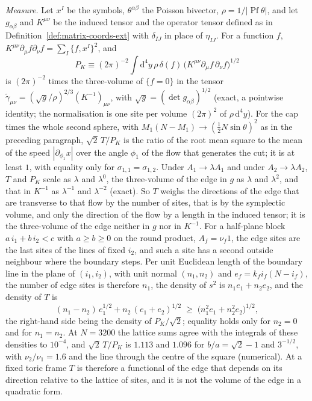 \emph{Measure.} Let \(x^I\) be the symbols, \(\theta^{\alpha\beta}\) the Poisson bivector, \(\rho=1/|\operatorname{Pf}\theta|\), and let \(g_{\alpha\beta}\) and \(K^{\mu\nu}\) be the induced tensor and the operator tensor defined as in Definition~\ref{def:matrix-coords-ext} with \(\delta_{IJ}\) in place of \(\eta_{IJ}\). For a function \(f\), \(K^{\mu\nu}\partial_\mu f\partial_\nu f=\sum_I\{f,x^I\}^2\), and
\[
P_K\equiv(2\pi)^{-2}\int\mathrm d^4y\,\rho\,\delta(f)\,\bigl(K^{\mu\nu}\partial_\mu f\,\partial_\nu f\bigr)^{1/2}
\]
is \((2\pi)^{-2}\) times the three-volume of \(\{f=0\}\) in the tensor \(\tilde\gamma_{\mu\nu}=(\sqrt g/\rho)^{2/3}(K^{-1})_{\mu\nu}\), with \(\sqrt g=(\det g_{\alpha\beta})^{1/2}\) (exact, a pointwise identity; the normalisation is one site per volume \((2\pi)^2\) of \(\rho\,\mathrm d^4y\)). For the cap times the whole second sphere, with \(M_1(N-M_1)\to(\tfrac12N\sin\theta)^2\) as in the preceding paragraph, \(\sqrt2\,T/P_K\) is the ratio of the root mean square to the mean of the speed \(|\partial_{\phi_1}x|\) over the angle \(\phi_1\) of the flow that generates the cut; it is at least \(1\), with equality only for \(\sigma_{1,1}=\sigma_{1,2}\). Under \(A_1\to\lambda A_1\) and under \(A_2\to\lambda A_2\), \(T\) and \(P_K\) scale as \(\lambda\) and \(\lambda^0\), the three-volume of the edge in \(g\) as \(\lambda\) and \(\lambda^2\), and that in \(K^{-1}\) as \(\lambda^{-1}\) and \(\lambda^{-2}\) (exact). So \(T\) weighs the directions of the edge that are transverse to that flow by the number of sites, that is by the symplectic volume, and only the direction of the flow by a length in the induced tensor; it is the three-volume of the edge neither in \(g\) nor in \(K^{-1}\). For a half-plane block \(a\,i_1+b\,i_2<c\) with \(a\ge b\ge0\) on the round product, \(A_f=\nu_f1\), the edge sites are the last sites of the lines of fixed \(i_2\), and such a site has a second outside neighbour where the boundary steps. Per unit Euclidean length of the boundary line in the plane of \((i_1,i_2)\), with unit normal \((n_1,n_2)\) and \(e_f=k_fi_f(N-i_f)\), the number of edge sites is therefore \(n_1\), the density of \(s^2\) is \(n_1e_1+n_2e_2\), and the density of \(T\) is
\[
(n_1-n_2)\,e_1^{1/2}+n_2\,(e_1+e_2)^{1/2}\;\ge\;\bigl(n_1^2e_1+n_2^2e_2\bigr)^{1/2},
\]
the right-hand side being the density of \(P_K/\sqrt2\); equality holds only for \(n_2=0\) and for \(n_1=n_2\). At \(N=3200\) the lattice sums agree with the integrals of these densities to \(10^{-4}\), and \(\sqrt2\,T/P_K\) is \(1.113\) and \(1.096\) for \(b/a=\sqrt2-1\) and \(3^{-1/2}\), with \(\nu_2/\nu_1=1.6\) and the line through the centre of the square (numerical). At a fixed toric frame \(T\) is therefore a functional of the edge that depends on its direction relative to the lattice of sites, and it is not the volume of the edge in a quadratic form.

